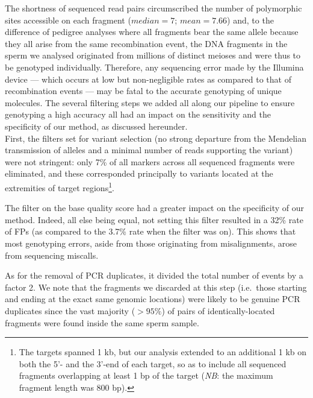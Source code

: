 The shortness of sequenced read pairs circumscribed the number of polymorphic sites accessible on each fragment ($median = 7$; $mean = 7.66$) and, to the difference of pedigree analyses where all fragments bear the same allele because they all arise from the same recombination event, the DNA fragments in the sperm we analysed originated from millions of distinct meioses and were thus to be genotyped individually.
Therefore, any sequencing error made by the Illumina device — which occurs at low \citep{fox2014accuracy,pfeiffer2018systematic} but non-negligible rates as compared to that of recombination events — may be fatal to the accurate genotyping of unique molecules.
The several filtering steps we added all along our pipeline to ensure genotyping a high accuracy all had an impact on the sensitivity and the specificity of our method, as discussed hereunder.\\


First, the filters set for variant selection (no strong departure from the Mendelian transmission of alleles and a minimal number of reads supporting the variant) were not stringent: only 7\% of all markers across all sequenced fragments were eliminated, and these corresponded principally to variants located at the extremities of target regions\footnote{The targets spanned 1 kb, but our analysis extended to an additional 1 kb on both the 5’- and the 3’-end of each target, so as to include all sequenced fragments overlapping at least 1 bp of the target (\textit{NB}: the maximum fragment length was 800 bp).}.

The filter on the base quality score had a greater impact on the specificity of our method.
Indeed, all else being equal, not setting this filter resulted in a 32\% rate of FPs (as compared to the 3.7\% rate when the filter was on).
This shows that most genotyping errors, aside from those originating from misalignments, arose from sequencing miscalls.

As for the removal of PCR duplicates, it divided the total number of events by a factor 2.
We note that the fragments we discarded at this step (i.e.\ those starting and ending at the exact same genomic locations) were likely to be genuine PCR duplicates since the vast majority ($> 95\%$) of pairs of identically-located fragments were found inside the same sperm sample.



